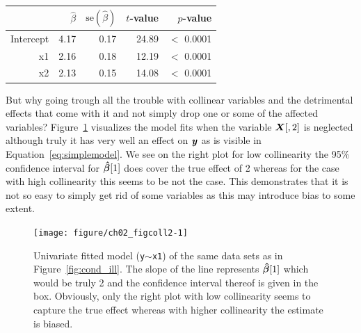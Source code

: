 \documentclass[11pt,a4paper,twoside]{book}\usepackage[]{graphicx}\usepackage[]{xcolor}
\newenvironment{knitrout}{}{} %
\begin{document}
\begin{table}[H]
\begin{subtable}[h]{0.45\textwidth}
\end{subtable}
\centering
\begin{subtable}[h]{0.45\textwidth}
\vspace{0.2cm}
\begingroup\footnotesize
\begin{tabular}{rrrrr}
  \toprule
 & $\hat\beta$ & $\text{se}\left(\hat\beta\right)$ & $t$-value & $p$-value \\ 
  \midrule
Intercept & 4.17 & 0.17 & 24.89 & $<$ 0.0001 \\ 
  x1 & 2.16 & 0.18 & 12.19 & $<$ 0.0001 \\ 
  x2 & 2.13 & 0.15 & 14.08 & $<$ 0.0001 \\ 
   \bottomrule
\end{tabular}
\endgroup

\end{subtable}
\end{table}


But why going trough all the trouble with collinear variables and the detrimental effects that come with it and not simply drop one or some of the affected variables? Figure~\ref{fig:coll2} visualizes the model fits when the variable ${\boldsymbol{X}}[,2]$ is neglected although truly it has very well an effect on ${\textbf{\textit{y}}}$ as is visible in Equation~\eqref{eq:simplemodel}. We see on the right plot for low collinearity the 95\% confidence interval for ${\boldsymbol{\hat\beta}}[1]$ does cover the true effect of 2 whereas for the case with high collinearity this seems to be not the case.
This demonstrates that it is not so easy to simply get rid of some variables as this may introduce bias to some extent.

\begin{figure}[h]%
\centering
\begin{knitrout}
\color{fgcolor}
\texttt{[image: figure/ch02\_figcoll2-1]} 
\end{knitrout}
\vspace{-5mm}
\caption{Univariate fitted model (\texttt{y$\sim$x1}) of the same data sets as in Figure~\ref{fig:cond_ill}. The slope of the line represents ${\boldsymbol{\hat\beta}}[1]$ which would be truly 2 and the confidence interval thereof is given in the box. Obviously, only the right plot with low collinearity seems to capture the true effect whereas with higher collinearity the estimate is biased.}\label{fig:coll2}
\end{figure}
\end{document}
